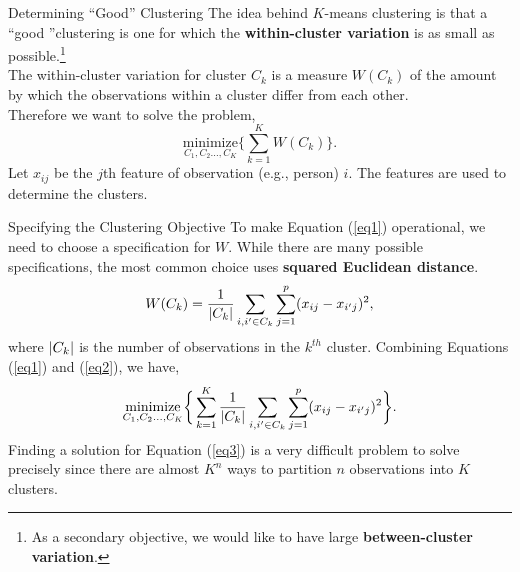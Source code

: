 \documentclass[pdf]{beamer}
\newcommand{\empr}[1]{{\color{franklinblue}\textbf{#1}}}
\theoremstyle{remark}
\theoremstyle{definition}
\begin{document}
\begin{frame}[t]{Determining ``Good'' Clustering}
 The idea behind $K$-means clustering is that a ``good ''clustering is one for which the \empr{within-cluster variation} is as small as possible.\footnote{As a secondary objective, we would like to have large \empr{between-cluster variation}.} \\ 
\vspace{1.5ex}
The within-cluster variation for cluster $C_k$ is a measure $W(C_k)$ of the amount by which the observations within a cluster differ from each other.  \\
\vspace{1.5ex}
Therefore we want to solve the problem, \\
\vspace{0.0ex}
\begin{equation}\label{eq1}
\underset{C_1, C_2 \ldots, C_K}{\text{minimize}} \bigg\{ \sum_{k=1}^{K} W(C_k) \bigg\}.
\end{equation}
Let $x_{ij}$ be the $j$th feature of observation (e.g., person) $i$.  The features are used to determine the clusters. 
\end{frame}

\begin{frame}[t]{Specifying the Clustering Objective}
To make Equation (\ref{eq1}) operational, we need to choose a specification for $W$.  While there are many possible specifications, the most common choice uses \empr{squared Euclidean distance}.  \\
\vspace{-0.5ex}
\begin{equation}\label{eq2}
W(C_k) = \frac{1}{\abs{C_k}} \sum_{i,i' \in C_k} \sum_{j=1}^{p}(x_{ij} - x_{i'j})^2,
\end{equation}
where $\abs{C_k}$ is the number of observations in the $k^{th}$ cluster.  Combining Equations (\ref{eq1}) and (\ref{eq2}), we have, \\
\vspace{-0.5ex}
\begin{equation}\label{eq3}
\underset{C_1, C_2 \ldots, C_K}{\text{minimize}} \bigg\{ \sum_{k=1}^{K} \frac{1}{\abs{C_k}} \sum_{i,i' \in C_k} \sum_{j=1}^{p}(x_{ij} - x_{i'j})^2 \bigg\}.
\end{equation}
Finding a solution for Equation (\ref{eq3}) is a very difficult problem to solve
precisely since there are almost $K^n$ ways to partition $n$ observations into $K$
clusters.%
\end{frame}
\end{document}
